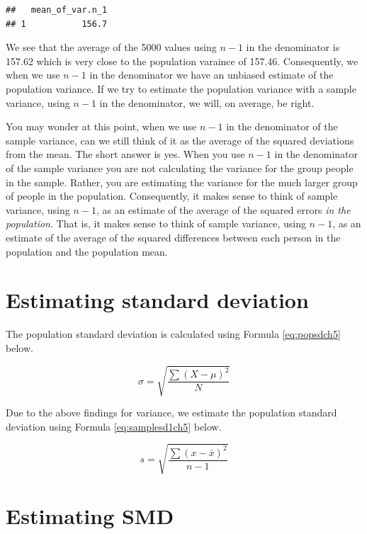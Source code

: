 \documentclass[
]{krantz}
\begin{document}
\begin{verbatim}
##   mean_of_var.n_1
## 1           156.7
\end{verbatim}

We see that the average of the 5000 values using \(n-1\) in the denominator is 157.62 which is very close to the population varaince of 157.46. Consequently, we when we use \(n-1\) in the denominator we have an unbiased estimate of the population variance. If we try to estimate the population variance with a sample variance, using \(n-1\) in the denominator, we will, on average, be right.

You may wonder at this point, when we use \(n-1\) in the denominator of the sample variance, can we still think of it as the average of the squared deviations from the mean. The short answer is yes. When you use \(n-1\) in the denominator of the sample variance you are not calculating the variance for the group people in the sample. Rather, you are estimating the variance for the much larger group of people in the population. Consequently, it makes sense to think of sample variance, using \(n-1\), as an estimate of the average of the squared errors \emph{in the population}. That is, it makes sense to think of sample variance, using \(n-1\), as an estimate of the average of the squared differences between each person in the population and the population mean.

\hypertarget{estimating-standard-deviation}{%
\section{Estimating standard deviation}\label{estimating-standard-deviation}}

The population standard deviation is calculated using Formula \eqref{eq:popsdch5} below.

\begin{equation} 
\sigma = \sqrt{\frac{\sum{(X- \mu)^2}}{N}}
      \label{eq:popsdch5}
\end{equation}

Due to the above findings for variance, we estimate the population standard deviation using Formula \eqref{eq:samplesd1ch5} below.

\begin{equation} 
s = \sqrt{\frac{\sum{(x - \bar{x})^2}}{n-1}}
      \label{eq:samplesd1ch5}
\end{equation}

\hypertarget{estimating-smd}{%
\section{Estimating SMD}\label{estimating-smd}}
\end{document}
